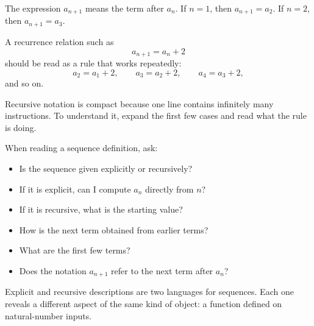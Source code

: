 The expression \(a_{n+1}\) means the term after \(a_n\). If \(n=1\), then \(a_{n+1}=a_2\). If \(n=2\), then \(a_{n+1}=a_3\).

A recurrence relation such as
\[
a_{n+1}=a_n+2
\]
should be read as a rule that works repeatedly:
\[
a_2=a_1+2,
\qquad
a_3=a_2+2,
\qquad
a_4=a_3+2,
\]
and so on.

\begin{remarkbox}
Recursive notation is compact because one line contains infinitely many instructions. To understand it, expand the first few cases and read what the rule is doing.
\end{remarkbox}

\begin{summarybox}
When reading a sequence definition, ask:
\begin{itemize}
\item Is the sequence given explicitly or recursively?
\item If it is explicit, can I compute \(a_n\) directly from \(n\)?
\item If it is recursive, what is the starting value?
\item How is the next term obtained from earlier terms?
\item What are the first few terms?
\item Does the notation \(a_{n+1}\) refer to the next term after \(a_n\)?
\end{itemize}
\end{summarybox}

Explicit and recursive descriptions are two languages for sequences. Each one reveals a different aspect of the same kind of object: a function defined on natural-number inputs.